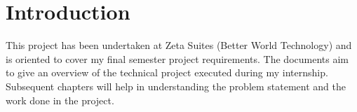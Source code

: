 \documentclass[12pt,a4paper]{report}
\begin{document}
\tableofcontents







\restoregeometry

\chapter{Introduction}
This project has been undertaken at Zeta Suites (Better World Technology) and is oriented to cover my final semester project requirements. The documents aim to give an overview of the technical project executed during my internship. Subsequent chapters will help in understanding the problem statement and the work done in the project.
\end{document}
